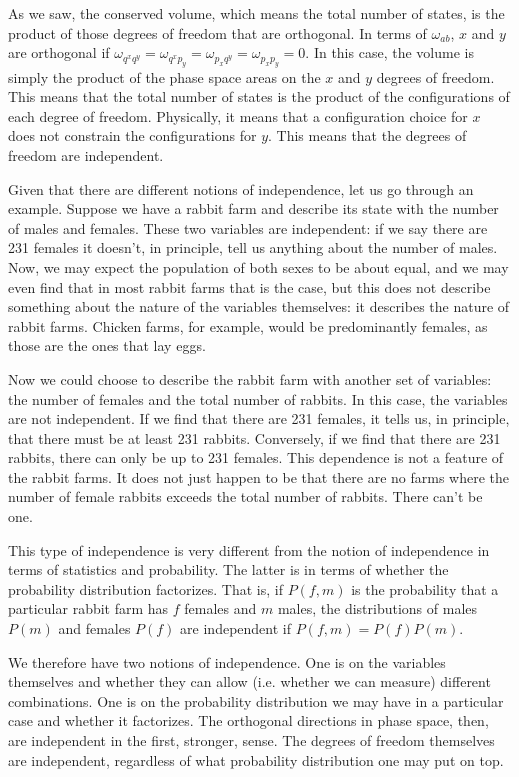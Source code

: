 As we saw, the conserved volume, which means the total number of states, is the product of those degrees of freedom that are orthogonal. In terms of $\omega_{ab}$, $x$ and $y$ are orthogonal if $\omega_{q^x q^y} = \omega_{q^x p_y} = \omega_{p_x q^y} = \omega_{p_x p_y} = 0$. In this case, the volume is simply the product of the phase space areas on the $x$ and $y$ degrees of freedom. This means that the total number of states is the product of the configurations of each degree of freedom. Physically, it means that a configuration choice for $x$ does not constrain the configurations for $y$. This means that the degrees of freedom are independent.

Given that there are different notions of independence, let us go through an example. Suppose we have a rabbit farm and describe its state with the number of males and females. These two variables are independent: if we say there are 231 females it doesn't, in principle, tell us anything about the number of males. Now, we may expect the population of both sexes to be about equal, and we may even find that in most rabbit farms that is the case, but this does not describe something about the nature of the variables themselves: it describes the nature of rabbit farms. Chicken farms, for example, would be predominantly females, as those are the ones that lay eggs.

Now we could choose to describe the rabbit farm with another set of variables: the number of females and the total number of rabbits. In this case, the variables are not independent. If we find that there are 231 females, it tells us, in principle, that there must be at least 231 rabbits. Conversely, if we find that there are 231 rabbits, there can only be up to 231 females. This dependence is not a feature of the rabbit farms. It does not just happen to be that there are no farms where the number of female rabbits exceeds the total number of rabbits. There can't be one.

This type of independence is very different from the notion of independence in terms of statistics and probability. The latter is in terms of whether the probability distribution factorizes. That is, if $P(f,m)$ is the probability that a particular rabbit farm has $f$ females and $m$ males, the distributions of males $P(m)$ and females $P(f)$ are independent if $P(f,m) = P(f) P(m)$. 

We therefore have two notions of independence. One is on the variables themselves and whether they can allow (i.e. whether we can measure) different combinations. One is on the probability distribution we may have in a particular case and whether it factorizes. The orthogonal directions in phase space, then, are independent in the first, stronger, sense. The degrees of freedom themselves are independent, regardless of what probability distribution one may put on top.

